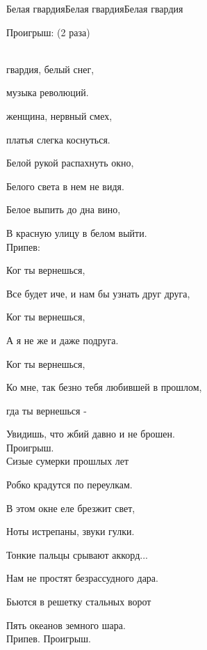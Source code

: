 \documentclass[11pt,a5paper]{book}
\begin{document}
\begin{song}{Белая гвардия}{}{Белая гвардия}{Белая гвардия}{}{}

Проигрыш: (2 раза)\par 
{}      \\

 гвардия, белый снег,\par
{} музыка революций.\par
{} женщина, нервный смех,\par
{} платья слегка коснуться.\par
 
Белой рукой распахнуть окно,\par
Белого света в нем не видя.\par
Белое выпить до дна вино,\par
В красную улицу в белом выйти.\\

Припев:\par
Ког ты вернешься,\par
Все будет иче, и нам бы узнать друг друга,\par
Ког ты вернешься,\par
А я не же и даже  подруга.\par
Ког ты вернешься,\par
Ко мне, так безно тебя любившей в прошлом,\par
{}гда ты вернешься -\par
Увидишь, что жбий давно и не  брошен.\\

Проигрыш.\\
 
\newpage
Сизые сумерки прошлых лет\par
Робко крадутся по переулкам.\par
В этом окне еле брезжит свет,\par
Ноты истрепаны, звуки гулки.\par
Тонкие пальцы срывают аккорд...\par
Нам не простят безрассудного дара.\par
Бьются в решетку стальных ворот\par
Пять океанов земного шара.\\

Припев. Проигрыш.\\
 

\end{song}
\end{document}
